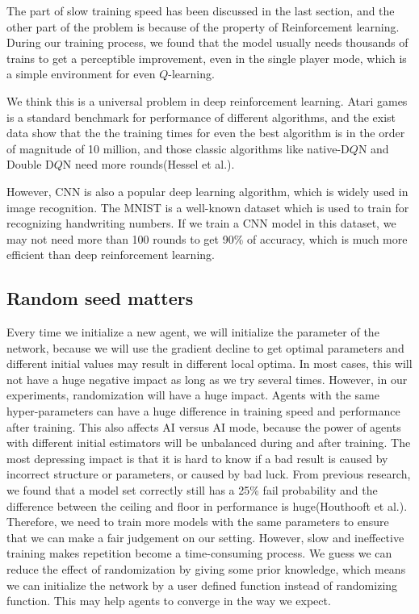 \documentclass[12pt]{article}
\begin{document}
The part of slow training speed has been discussed in the last section, and the other part of the problem is because of the property of Reinforcement learning. During our training process, we found that the model usually needs thousands of trains to get a perceptible improvement, even in the single player mode, which is a simple environment for even $Q$-learning.

We think this is a universal problem in deep reinforcement learning. Atari games is a standard benchmark for performance of different algorithms, and the exist data show that the the training times for even the best algorithm is in the order of magnitude of 10 million, and those classic algorithms like native-D$Q$N and Double D$Q$N need more rounds(Hessel et al.).

However, CNN is also a popular deep learning algorithm, which is widely used in image recognition. The MNIST is a well-known dataset which is used to train for recognizing handwriting numbers. If we train a CNN model in this dataset, we may not need more than 100 rounds to get 90\% of accuracy, which is much more efficient than deep reinforcement learning.

\subsection{Random seed matters}
Every time  we initialize a new agent, we will initialize the parameter of the network, because we will use the gradient decline to get optimal parameters and different initial values may result in different local optima. In most cases, this will not have a huge negative impact as long as we try several times.
However, in our experiments, randomization will have a huge impact. Agents with the same hyper-parameters can have a huge difference in training speed and  performance after training. This also affects AI versus AI mode, because the power of agents with different initial estimators will be unbalanced during and after training.
The most depressing impact is that it is hard to know if a bad result is caused by incorrect structure or parameters, or caused by bad luck. From previous research, we found that a model set correctly still has a 25\% fail probability and the difference between the ceiling and floor in performance is huge(Houthooft et al.). Therefore, we need to train more models with the same parameters to ensure that we can make a fair judgement on our setting. However, slow and ineffective training makes repetition become a time-consuming process.
We guess we can reduce the effect of randomization by giving some prior knowledge, which means we can initialize the network by a user defined function instead of randomizing function. This may help agents to converge in the way we expect.
\end{document}
